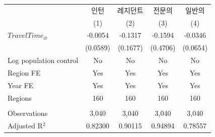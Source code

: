 \begingroup
\centering
\begin{tabular}{lcccc}
   \toprule
                          & 인턴     & 레지던트 & 전문의   & 일반의 \\   
                          & (1)      & (2)      & (3)      & (4)\\  
   \midrule 
   $TravelTime_{it}$      & -0.0054  & -0.1317  & -0.1594  & -0.0346\\   
                          & (0.0589) & (0.1677) & (0.4706) & (0.0654)\\   
   Log population control & No       & No       & No       & No\\  
   Region FE              & Yes      & Yes      & Yes      & Yes\\  
   Year FE                & Yes      & Yes      & Yes      & Yes\\  
   Regions                & 160      & 160      & 160      & 160\\  
    \\
   Observations           & 3,040    & 3,040    & 3,040    & 3,040\\  
   Adjusted R$^2$         & 0.82300  & 0.90115  & 0.94894  & 0.78557\\  
   \bottomrule
\end{tabular}
\par\endgroup
